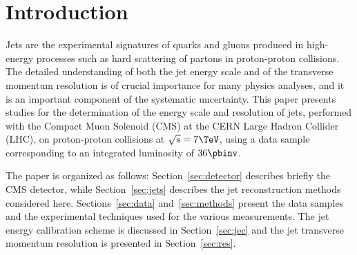\section{Introduction}

Jets are the experimental signatures of quarks and gluons produced in high-energy processes such as hard scattering of partons in proton-proton collisions. The detailed understanding of both the jet energy scale and of the transverse momentum resolution is of crucial importance for many physics analyses, and it is an important component of the systematic uncertainty. This paper presents studies for the determination of the energy scale and resolution of jets, performed with the Compact Muon Solenoid (CMS) at the CERN Large Hadron Collider (LHC), on proton-proton collisions at $\sqrt{s}=7\TeV$, using a data sample corresponding to an integrated luminosity of $36\pbinv$.

The paper is organized as follows: Section~\ref{sec:detector} describes briefly the CMS detector, while Section~\ref{sec:jets} describes the jet reconstruction methods considered here. Sections~\ref{sec:data} and~\ref{sec:methods} present the data samples and the experimental techniques used for the various measurements. The jet energy calibration scheme is discussed in Section~\ref{sec:jec} and the jet transverse momentum resolution is presented in Section~\ref{sec:res}. 
